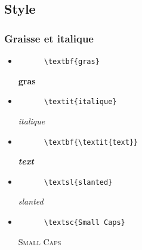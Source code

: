 \documentclass[a4paper,12pt]{article}
\begin{document}
\subsection{Style}
\subsubsection{Graisse et italique}
\begin{itemize}
  \renewcommand\labelitemi{}
  \item
  \begin{minipage}[t]{.46\linewidth}
    \begin{verbatim}
      \textbf{gras}
    \end{verbatim}
  \end{minipage} \hfill
  \begin{minipage}[t]{.46\linewidth}
    \textbf{gras}
  \end{minipage}
  \item
  \begin{minipage}[t]{.46\linewidth}
    \begin{verbatim}
      \textit{italique}
    \end{verbatim}
  \end{minipage} \hfill
  \begin{minipage}[t]{.46\linewidth}
    \textit{italique}
  \end{minipage}
  \item
  \begin{minipage}[t]{.46\linewidth}
    \begin{verbatim}
      \textbf{\textit{text}}
    \end{verbatim}
  \end{minipage} \hfill
  \begin{minipage}[t]{.46\linewidth}
    \textbf{\textit{text}}
  \end{minipage}
  \item
  \begin{minipage}[t]{.46\linewidth}
    \begin{verbatim}
      \textsl{slanted}
    \end{verbatim}
  \end{minipage} \hfill
  \begin{minipage}[t]{.46\linewidth}
    \textsl{slanted}
  \end{minipage}
  \item
  \begin{minipage}[t]{.46\linewidth}
    \begin{verbatim}
      \textsc{Small Caps}
    \end{verbatim}
  \end{minipage} \hfill
  \begin{minipage}[t]{.46\linewidth}
    \textsc{Small Caps}
  \end{minipage}
\end{itemize}
\end{document}
